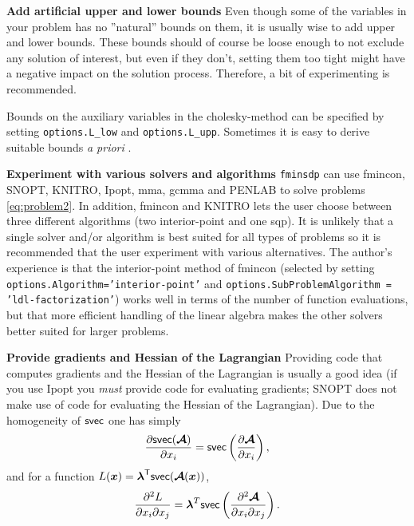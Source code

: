 \documentclass{article}
\newcommand{\bm}[1]{\mbox{\boldmath $#1$}}
\newcommand{\T}{\textsf{T}}
\newcommand{\svec}{\mbox{\textsf{svec}}}
\begin{document}
\vskip 2mm
\noindent\textbf{Add artificial upper and lower bounds}
\vskip 2mm
\noindent Even though some of the variables in your problem has no  ''natural'' bounds on them, it is usually wise
to add upper and lower bounds. These bounds should of course be loose enough to not exclude any solution of 
interest, but even if they don't, setting them too tight might have a negative impact on the solution process.
Therefore, a bit of experimenting is recommended.

Bounds on the auxiliary variables in the cholesky-method can be specified by setting \texttt{options.L\_low} and \texttt{options.L\_upp}. Sometimes it is easy to derive
suitable bounds \textit{a priori} \cite{Thore:2015}.


\vskip 5mm
\noindent\textbf{Experiment with various solvers and algorithms}
\vskip 2mm
\noindent \texttt{fminsdp} can use fmincon, SNOPT, KNITRO, Ipopt, mma, gcmma and PENLAB to solve problems \eqref{eq:problem2}. In addition, fmincon
and KNITRO lets the user choose between three different algorithms (two interior-point and one sqp). It is unlikely that a single solver and/or algorithm is best suited for all types of problems so it is recommended that the user experiment with various 
alternatives. The author's experience is that the interior-point method of fmincon (selected by setting \texttt{options.Algorithm='interior-point'} and \texttt{options.SubProblemAlgorithm = 'ldl-factorization'}) works well in
terms of the number of function evaluations, but that more efficient handling of the linear algebra makes the other solvers 
better suited for larger problems.

\vskip 5mm
\noindent\textbf{Provide gradients and Hessian of the Lagrangian}
\vskip 2mm
\noindent Providing code that computes gradients and the Hessian of the Lagrangian is usually a good idea (if you use Ipopt you \textit{must} provide code for evaluating gradients; SNOPT does not make use of code for evaluating the Hessian of the Lagrangian). Due to the homogeneity of $\svec$ one has simply
\begin{equation}\nonumber
\frac{\partial \svec(\bm{\mathcal{A}})}{\partial x_{i}} = \svec\left(\frac{\partial \bm{\mathcal{A}}}{\partial x_{i}}\right),
\end{equation}
and for a function $L(\bm{x}) = \bm{\lambda}^{\T}\svec(\bm{\mathcal{A}}(\bm{x}))$,
\begin{equation}\nonumber
\frac{\partial^2 L}{\partial x_{i}\partial x_{j}} =  \bm{\lambda}^{T}\svec\left(\frac{\partial^2 \bm{\mathcal{A}}}{\partial x_{i}\partial x_{j}}\right).
\end{equation}
\end{document}
